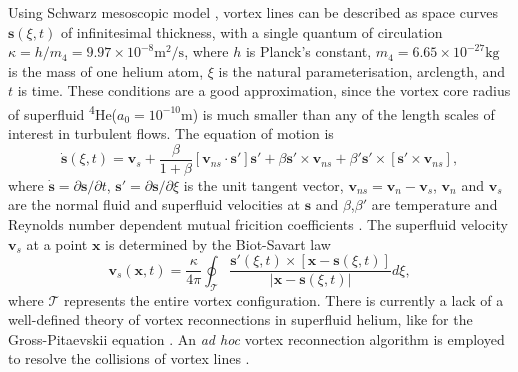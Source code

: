 \documentclass[%
 reprint,
 amsmath,amssymb,
 aps,
 prl,
]{revtex4-2}
\def \s{\mathbf{s}}
\def \v{\mathbf{v}}
\def \x{\mathbf{x}}
\begin{document}
{Using Schwarz mesoscopic model \cite{schwarz1988}, vortex lines can be described as space curves $\s(\xi,t)$ of infinitesimal thickness, with a single quantum of circulation $\kappa=h/m_4=9.97\times10^{-8}\text{m}^2/\text{s}$, where $h$ is Planck's constant, $m_4=6.65\times10^{-27}\text{kg}$ is the mass of one helium atom, $\xi$ is the natural parameterisation, arclength, and $t$ is time. These conditions are a good approximation, since the vortex core radius of superfluid \textsuperscript{4}He($a_0=10^{-10}\text{m}$) is much smaller than any of the length scales of interest in turbulent flows. The equation of motion is
\begin{equation}
	\dot{\s}(\xi,t) = \v_s + \frac{\beta}{1+\beta}\left[\v_{ns}\cdot \s'\right]\s' + \beta\s'\times\v_{ns}+\beta'\s'\times\left[\s'\times \v_{ns}\right],
\end{equation}
where $\dot{\s}=\partial\s/\partial t$, $\s'=\partial\s/\partial \xi$ is the unit tangent vector, $\v_{ns}=\v_n - \v_s$, $\v_n$ and $\v_s$ are the normal fluid and superfluid velocities at $\s$ and $\beta$,$\beta'$ are temperature and Reynolds number dependent mutual fricition coefficients \cite{galantucciNewSelfconsistentApproach2020b}. The superfluid velocity $\v_s$ at a point $\x$ is determined by the Biot-Savart law
\begin{equation}
	\v_s(\x,t) = \frac{\kappa}{4\pi}\oint_{\mathcal{T}}\frac{\s'(\xi,t)\times\left[\x-\s(\xi,t)\right]}{|\x-\s(\xi,t)|}d\xi,
\end{equation}
where $\mathcal{T}$ represents the entire vortex configuration.
There is currently a lack of a well-defined theory of vortex reconnections in superfluid helium, like for the Gross-Pitaevskii equation \cite{villois2020irreversible,villoisUniversalNonuniversalAspects2017,promentMatchingTheoryCharacterize2020a}. An \emph{ad hoc} vortex reconnection algorithm is employed to resolve the collisions of vortex lines \cite{baggaleySensitivityVortexFilament2012a}.

}
\end{document}
